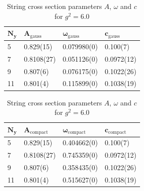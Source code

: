 \begin{table}[!hb]
\centering
\begin{tabular}{llll}
    $\mathbf{N_y}$ & $\mathbf{A_\mathrm{gauss}}$ & $\mathbf{\omega_\mathrm{gauss}}$ & $\mathbf{c_\mathrm{gauss}}$ \\ \hline
   5 & 0.829(15) & 0.079980(0) & 0.100(7) \\
   7 & 0.8108(27) & 0.051126(0) & 0.0972(12) \\
   9 & 0.807(6) & 0.076175(0) & 0.1022(26) \\
   11 & 0.801(4) & 0.115899(0) & 0.1038(19) \\
\end{tabular}
\begin{tabular}{llll}
    $\mathbf{N_y}$ & $\mathbf{A_\mathrm{compact}}$ & $\mathbf{\omega_\mathrm{compact}}$ & $\mathbf{c_\mathrm{compact}}$ \\ \hline
   5 & 0.829(15) & 0.404662(0) & 0.100(7) \\
   7 & 0.8108(27) & 0.745359(0) & 0.0972(12) \\
   9 & 0.807(6) & 0.358435(0) & 0.1022(26) \\
   11 & 0.801(4) & 0.515627(0) & 0.1038(19) \\
\end{tabular}
\caption{String cross section parameters $A$, $\omega$ and $c$ for $g^2=6.0$}
\end{table}
